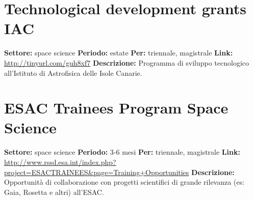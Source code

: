 \documentclass[a4paper,10pt]{article}
\begin{document}
{\section{Technological development grants IAC}
\textbf{Settore:} space science\newline
\textbf{Periodo:} estate\newline
\textbf{Per:} triennale, magistrale\newline
\textbf{Link:} \url{http://tinyurl.com/guh8xf7} \newline
\textbf{Descrizione:} Programma di sviluppo tecnologico all'Istituto di Astrofisica delle Isole Canarie.  

\section{ESAC Trainees Program Space Science}
\textbf{Settore:} space science \newline
\textbf{Periodo:} 3-6 mesi \newline
\textbf{Per:} triennale, magistrale \newline
\textbf{Link:} \url{http://www.rssd.esa.int/index.php?project=ESACTRAINEES&page=Training+Opportunities} \newline
\textbf{Descrizione:} Opportunità di collaborazione con progetti scientifici di grande rilevanza (es: Gaia, Rosetta e altri) all'ESAC.  

}
\end{document}

